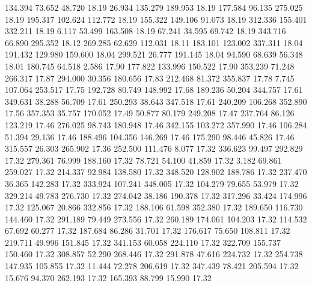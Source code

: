  134.394   73.652   48.720        18.19
  26.934  135.279  189.953        18.19
 177.584   96.135  275.025        18.19
 195.317  102.624  112.772        18.19
 155.322  149.106   91.073        18.19
 312.336  155.401  332.211        18.19
   6.117   53.499  163.508        18.19
  67.241   34.595   69.742        18.19
 343.716   66.890  295.352        18.12
 269.285   62.629  112.031        18.11
 183.101  123.002  337.311        18.04
 191.432  129.980  159.600        18.04
 299.521   26.777  191.145        18.04
  94.590   68.639   56.348        18.01
 180.745   64.518    2.586        17.90
 177.822  133.996  150.522        17.90
 353.239   71.248  266.317        17.87
 294.000   30.356  180.656        17.83
 212.468   81.372  355.837        17.78
   7.745  107.064  253.517        17.75
 192.728   80.749  148.992        17.68
 189.236   50.204  344.757        17.61
 349.631   38.288   56.709        17.61
 250.293   38.643  347.518        17.61
 240.209  106.268  352.890        17.56
 357.353   35.757  170.052        17.49
  50.877   80.179  249.208        17.47
 237.764   86.126  123.219        17.46
 276.025   98.743  180.948        17.46
 342.155  103.272  357.990        17.46
 106.284   51.394   29.136        17.46
 188.496  104.356  146.269        17.46
 175.290   98.446   45.826        17.46
 315.557   26.303  265.902        17.36
 252.500  111.476    8.077        17.32
 336.623   99.497  292.829        17.32
 279.361   76.999  188.160        17.32
  78.721   54.100   41.859        17.32
   3.182   69.861  259.027        17.32
 214.337   92.984  138.580        17.32
 348.520  128.902  188.786        17.32
 237.470   36.365  142.283        17.32
 333.924  107.241  348.005        17.32
 104.279   79.655   53.979        17.32
 329.214   49.783  276.730        17.32
 274.042   38.186  190.378        17.32
 317.296   33.424  174.996        17.32
 125.067   20.866  332.856        17.32
 188.106   61.598  352.380        17.32
 189.650  116.730  144.460        17.32
 291.189   79.449  273.556        17.32
 260.189  174.061  104.203        17.32
 114.532   67.692   60.277        17.32
 187.684   86.286   31.701        17.32
 176.617   75.650  108.811        17.32
 219.711   49.996  151.845        17.32
 341.153   60.058  224.110        17.32
 322.709  155.737  150.460        17.32
 308.857   52.290  268.446        17.32
 291.878   47.616  224.732        17.32
 254.738  147.935  105.855        17.32
  11.444   72.278  206.619        17.32
 347.439   78.421  205.594        17.32
  15.676   94.370  262.193        17.32
 165.393   88.799   15.990        17.32

